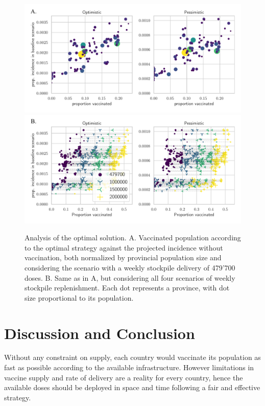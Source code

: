\begin{figure}[!ht]
\centering
\includegraphics{fig_italy-ocp/figures/scatter_top.pdf}
\includegraphics{fig_italy-ocp/figures/scatter_scn.pdf}
\caption[Analysis of the optimal solution]{Analysis of the optimal solution. A. Vaccinated population according to the optimal strategy against the projected incidence without vaccination, both normalized by provincial population size and considering the scenario with a weekly stockpile delivery of 479'700 doses. B. Same as in A, but considering all four scenarios of weekly stockpile replenishment. Each dot represents a province, with dot size proportional to its population.}
    \label{fig:OC_scatter}
\end{figure}


\section{Discussion and Conclusion}
Without any constraint on supply, each country would vaccinate its population as fast as possible according to the available infrastructure. However limitations in vaccine supply and rate of delivery are a reality for every country, hence the available doses should be deployed in space and time following a fair and effective strategy. 


